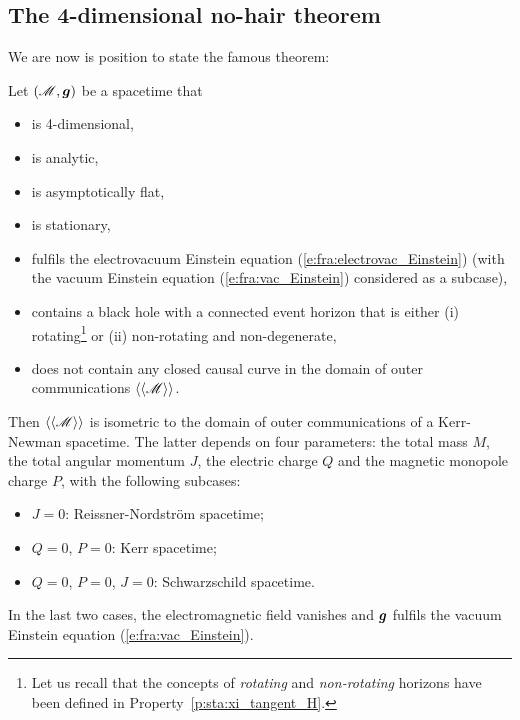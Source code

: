 \subsection{The 4-dimensional no-hair theorem} \label{s:sta:the_no-hair_thm}

We are now is position to state the famous theorem:
\begin{prop}
Let $(\mathscr{M},\bm{g})$ be a spacetime that
\begin{itemize}
\item is 4-dimensional,
\item is analytic,
\item is asymptotically flat,
\item is stationary,
\item fulfils the electrovacuum Einstein equation (\ref{e:fra:electrovac_Einstein}) (with the vacuum Einstein equation (\ref{e:fra:vac_Einstein}) considered as a subcase),
\item contains a black hole with a connected event horizon
that is either (i) rotating\footnote{Let us recall that
the concepts of \emph{rotating} and \emph{non-rotating} horizons
have been defined in Property~\ref{p:sta:xi_tangent_H}.}
 or (ii) non-rotating and non-degenerate,
\item does not contain any closed causal curve in the domain of outer
communications $\langle\langle \mathscr{M}\rangle\rangle$.
\end{itemize}
Then $\langle\langle \mathscr{M}\rangle\rangle$ is isometric
to the domain of outer communications of a Kerr-Newman spacetime.
The latter depends on four parameters: the total mass $M$, the
total angular momentum $J$, the electric charge $Q$ and the magnetic
monopole charge $P$, with the following subcases:
\begin{itemize}
\item $J=0$: Reissner-Nordström spacetime;
\item $Q=0$, $P=0$: Kerr spacetime;
\item $Q=0$, $P=0$, $J=0$: Schwarzschild spacetime.
\end{itemize}
In the last two cases, the electromagnetic field vanishes and $\bm{g}$
fulfils the vacuum Einstein equation (\ref{e:fra:vac_Einstein}).
\end{prop}

